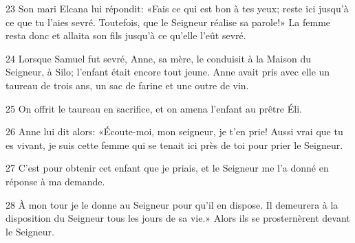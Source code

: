
23 Son mari Elcana lui répondit: «Fais ce qui est bon à tes yeux; reste ici jusqu’à ce que tu l’aies sevré. Toutefois, que le Seigneur réalise sa parole!» La femme resta donc et allaita son fils jusqu’à ce qu’elle l’eût sevré.

24 Lorsque Samuel fut sevré, Anne, sa mère, le conduisit à la Maison du Seigneur, à Silo; l’enfant était encore tout jeune. Anne avait pris avec elle un taureau de trois ans, un sac de farine et une outre de vin.

25 On offrit le taureau en sacrifice, et on amena l’enfant au prêtre Éli.

26 Anne lui dit alors: «Écoute-moi, mon seigneur, je t’en prie! Aussi vrai que tu es vivant, je suis cette femme qui se tenait ici près de toi pour prier le Seigneur.

27 C’est pour obtenir cet enfant que je priais, et le Seigneur me l’a donné en réponse à ma demande.

28 À mon tour je le donne au Seigneur pour qu’il en dispose. Il demeurera à la disposition du Seigneur tous les jours de sa vie.» Alors ils se prosternèrent devant le Seigneur.